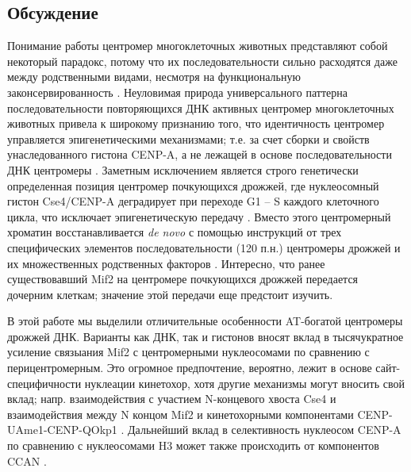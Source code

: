 \subsection{Обсуждение}
Понимание работы центромер многоклеточных животных представляют собой некоторый парадокс, потому что их последовательности сильно расходятся даже между родственными видами, несмотря на функциональную законсервированность \cite{henikoff_centromere_2001}. Неуловимая природа универсального паттерна последовательности повторяющихся ДНК активных центромер многоклеточных животных привела к широкому признанию того, что идентичность центромер управляется эпигенетическими механизмами; т.е. за счет сборки и свойств унаследованного гистона CENP-A, а не лежащей в основе последовательности ДНК центромеры \cite{sullivan_determining_2001,allshire_epigenetic_2008,black_epigenetic_2011}. Заметным исключением является строго генетически определенная позиция центромер почкующихся дрожжей, где нуклеосомный гистон Cse4/CENP-A деградирует при переходе G1 – S каждого клеточного цикла, что исключает эпигенетическую передачу \cite{biggins_composition_2013,wisniewski_imaging_2014}. Вместо этого центромерный хроматин восстанавливается \textit{de novo} с помощью инструкций от трех специфических элементов последовательности (120 п.н.) центромеры дрожжей и их множественных родственных факторов \cite{westermann_structures_2007}. Интересно, что ранее существовавший Mif2 на центромере почкующихся дрожжей передается дочерним клеткам; значение этой передачи еще предстоит изучить.

В этой работе мы выделили отличительные особенности AT-богатой центромеры дрожжей ДНК. Варианты как ДНК, так и гистонов вносят вклад в тысячукратное усиление связыания Mif2 с центромерными нуклеосомами по сравнению с перицентромерным. Это огромное предпочтение, вероятно, лежит в основе сайт-специфичности нуклеации кинетохор, хотя другие механизмы могут вносить свой вклад; напр. взаимодействия с участием N-концевого хвоста Cse4 \cite{chen_n_2000,samel_methylation_2012} и взаимодействия между N концом Mif2 и кинетохорными компонентами CENP-UAme1-CENP-QOkp1 \cite{hornung_cooperative_2014}. Дальнейший вклад в селективность нуклеосом CENP-A по сравнению с нуклеосомами H3 может также происходить от компонентов CCAN \cite{weir_insights_2016}.

